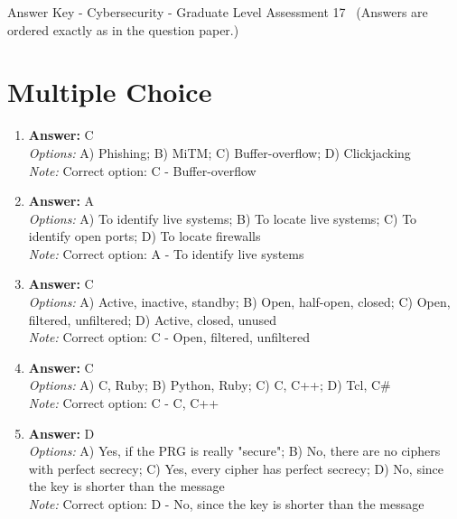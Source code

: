 \documentclass[12pt]{article}
\begin{document}
\begin{center}
Answer Key - Cybersecurity - Graduate Level Assessment 17 \
\small (Answers are ordered exactly as in the question paper.)
\end{center}

\section*{Multiple Choice}
\begin{enumerate}[label=\arabic*.]
\item \textbf{Answer:} C
\\ \textit{Options:} A) Phishing; B) MiTM; C) Buffer-overflow; D) Clickjacking
\\ \textit{Note:} Correct option: C - Buffer-overflow
\item \textbf{Answer:} A
\\ \textit{Options:} A) To identify live systems; B) To locate live systems; C) To identify open ports; D) To locate firewalls
\\ \textit{Note:} Correct option: A - To identify live systems
\item \textbf{Answer:} C
\\ \textit{Options:} A) Active, inactive, standby; B) Open, half-open, closed; C) Open, filtered, unfiltered; D) Active, closed, unused
\\ \textit{Note:} Correct option: C - Open, filtered, unfiltered
\item \textbf{Answer:} C
\\ \textit{Options:} A) C, Ruby; B) Python, Ruby; C) C, C++; D) Tcl, C\#
\\ \textit{Note:} Correct option: C - C, C++
\item \textbf{Answer:} D
\\ \textit{Options:} A) Yes, if the PRG is really "secure"; B) No, there are no ciphers with perfect secrecy; C) Yes, every cipher has perfect secrecy; D) No, since the key is shorter than the message
\\ \textit{Note:} Correct option: D - No, since the key is shorter than the message
\end{enumerate}
\end{document}
